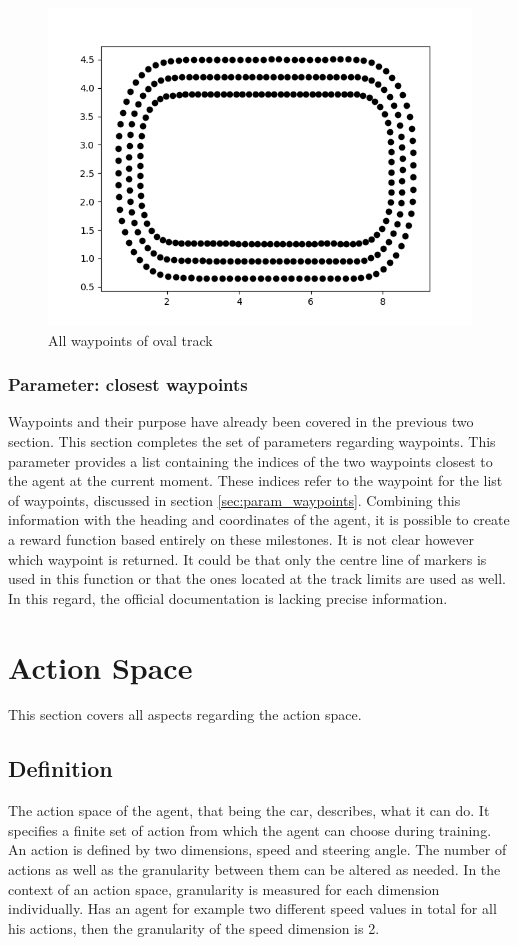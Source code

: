 \begin{figure}
    \centering
    \includegraphics[width=.85\textwidth]{images/oval_track_waypoints_all.png}
    \caption{All waypoints of oval track}
    \label{fig:waypoints_oval_all}
\end{figure}

\subsubsection{Parameter: closest waypoints}
Waypoints and their purpose have already been covered in the previous two section. This section completes the set of parameters regarding waypoints. This parameter provides a list containing the indices of the two waypoints closest to the agent at the current moment. These indices refer to the waypoint for the list of waypoints, discussed in section \ref{sec:param_waypoints}. Combining this information with the heading and coordinates of the agent, it is possible to create a reward function based entirely on these milestones. It is not clear however which waypoint is returned. It could be that only the centre line of markers is used in this function or that the ones located at the track limits are used as well. In this regard, the official documentation is lacking precise information.

\section{Action Space}
This section covers all aspects regarding the action space.
\subsection{Definition}
The action space of the agent, that being the car, describes, what it can do. It specifies a finite set of action from which the agent can choose during training. An action is defined by two dimensions, speed and steering angle. The number of actions as well as the granularity between them can be altered as needed. In the context of an action space, granularity is measured for each dimension individually. Has an agent for example two different speed values in total for all his actions, then the granularity of the speed dimension is 2.

